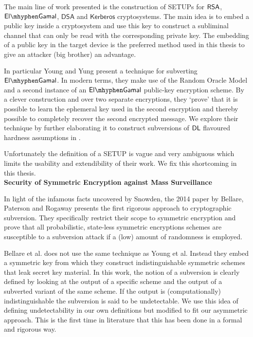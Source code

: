 The main line of work presented is the construction of SETUPs for $\mathsf{RSA}$, $\elGamal$, $\mathsf{DSA}$ and $\mathsf{Kerberos}$ cryptosystems. The main idea is to embed a public key inside a cryptosystem and use this key to construct a subliminal channel that can only be read with the corresponding private key. The embedding of a public key in the target device is the preferred method used in this thesis to give an attacker (big brother) an advantage. 

In particular Young and Yung present a technique for subverting $\elGamal$. In modern terms, they make use of the Random Oracle Model and a second instance of an $\elGamal$ public-key encryption scheme. By a clever construction and over two separate encryptions, they `prove' that it is possible to learn the ephemeral key used in the second encryption and thereby possible to completely recover the second encrypted message. We explore their technique by further elaborating it to construct subversions of $\mathsf{DL}$ flavoured hardness assumptions in .

Unfortunately the definition of a SETUP is vague and very ambiguous which limits the usability and extendibility of their work. We fix this shortcoming in this thesis. \\

\noindent\textbf{Security of Symmetric Encryption against Mass Surveillance \cite{DBLP:secSym}}
	
In light of the infamous facts uncovered by Snowden, the 2014 paper by Bellare, Paterson and Rogaway presents the first rigorous approach to cryptographic subversion. They specifically restrict their scope to symmetric encryption and prove that all probabilistic, state-less symmetric encryptions schemes are susceptible to a subversion attack if a (low) amount of randomness is employed. 

Bellare et al. does not use the same technique as Young et al. Instead they embed a symmetric key from which they construct indistinguishable symmetric schemes that leak secret key material. In this work, the notion of a subversion is clearly defined by looking at the output of a specific scheme and the output of a subverted variant of the same scheme. If the output is (computationally) indistinguishable the subversion is said to be undetectable. We use this idea of defining undetectability in our own definitions but modified to fit our asymmetric approach. This is the first time in literature that this has been done in a formal and rigorous way. 

